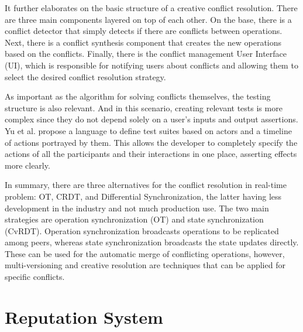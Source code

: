 It further elaborates on the basic structure of a creative conflict resolution. There are three main components layered on top of each other. On the base, there is a conflict detector that simply detects if there are conflicts between operations. Next, there is a conflict synthesis component that creates the new operations based on the conflicts. Finally, there is the conflict management User Interface (UI), which is responsible for notifying users about conflicts and allowing them to select the desired conflict resolution strategy.

As important as the algorithm for solving conflicts themselves, the testing structure is also relevant. And in this scenario, creating relevant tests is more complex since they do not depend solely on a user's inputs and output assertions. Yu et al. \cite{Yu2007} propose a language to define test suites based on actors and a timeline of actions portrayed by them. This allows the developer to completely specify the actions of all the participants and their interactions in one place, asserting effects more clearly.

In summary, there are three alternatives for the conflict resolution in real-time problem: OT, CRDT, and Differential Synchronization, the latter having less development in the industry and not much production use. The two main strategies are operation synchronization (OT) and state synchronization (CvRDT). Operation synchronization broadcasts operations to be replicated among peers, whereas state synchronization broadcasts the state updates directly. These can be used for the automatic merge of conflicting operations, however, multi-versioning and creative resolution are techniques that can be applied for specific conflicts.

\section{Reputation System}\label{sec:rep-sys-sota}


